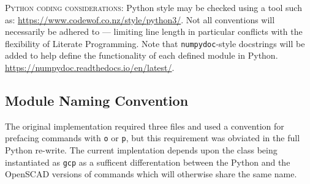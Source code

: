 \documentclass{ltxdoc}
\begin{document}


\smallskip

\noindent\textsc{Python coding considerations:} Python style may be checked using a tool such as: \url{https://www.codewof.co.nz/style/python3/}. Not all conventions will necessarily be adhered to --- limiting line length in particular conflicts with the flexibility of Literate Programming. Note that \verb|numpydoc|-style docstrings will be added to help define the functionality of each defined module in Python. \url{https://numpydoc.readthedocs.io/en/latest/}.

\subsection{Module Naming Convention}

The original implementation required three files and used a convention for prefacing commands with \verb|o| or \verb|p|, but this requirement was obviated in the full Python re-write. The current implentation depends upon the class being instantiated as \verb|gcp| as a sufficent differentation between the Python and the OpenSCAD versions of commands which will otherwise share the same name.
\end{document}
